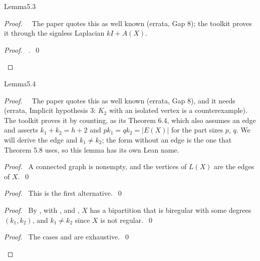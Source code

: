 \begin{cgss}{Lemma}{5.3}\label{lem:5.3}
\end{cgss}
\begin{proof}
 \pfsketch\ \repair\ The paper quotes this as well known (errata, Gap 8); the toolkit proves it
 through the signless Laplacian $kI+A(X)$.
 \qedstep
 \begin{proof}\pf\ .~\qed\end{proof}
\end{proof}

\begin{cgss}{Lemma}{5.4}\label{lem:5.4}
\end{cgss}
\begin{proof}
 \pfsketch\ \repair\ The paper quotes this as well known (errata, Gap 8), and it needs
  (errata, Implicit hypothesis 3: $K_2$ with an isolated vertex is a counterexample).
 The toolkit proves it by counting, as its Theorem 6.4, which also assumes an edge and asserts
 $k_1+k_2=h+2$ and $pk_1=qk_2=|E(X)|$ for the part sizes $p$, $q$. We will derive the edge and
 $k_1\ne k_2$; the form without an edge is the one that Theorem 5.8 uses, so this lemma has its
 own Lean name.
 \begin{proof}\pf\ A connected graph is nonempty, and the vertices of $L(X)$ are the edges of
  $X$.~\qed\end{proof}
 \begin{proof}\pf\ This is the first alternative.~\qed\end{proof}
 \begin{proof}\pf\ By , with ,  and , $X$
  has a bipartition that is biregular with some degrees $(k_1,k_2)$, and $k_1\ne k_2$ since $X$
  is not regular.~\qed\end{proof}
 \qedstep
 \begin{proof}\pf\ The cases  and  are
  exhaustive.~\qed\end{proof}
\end{proof}

